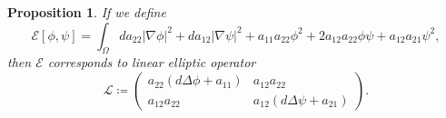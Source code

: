\documentclass[11pt]{amsart}
\numberwithin{equation}{section}
\theoremstyle{plain}
\newtheorem{proposition}[theorem]{Proposition}
\theoremstyle{definition}
\begin{document}
\begin{proposition}
If we define
\begin{equation} \label{energy functional}
	\mathcal{E}[\phi,\psi]=\int_{\Omega} da_{22}\lvert \nabla \phi \rvert^2+da_{12} \lvert \nabla \psi \rvert^2 +a_{11}a_{22} \phi^2+2a_{12}a_{22}\phi\psi+a_{12}a_{21} \psi^2,
\end{equation}
then $\mathcal{E}$ corresponds to linear elliptic operator
\begin{equation*}
	\mathcal{L} \coloneqq \begin{pmatrix}
	a_{22}(d\Delta \phi +a_{11}) & a_{12}a_{22} \\
		a_{12}a_{22} & a_{12}(d\Delta\psi+ a_{21})
\end{pmatrix}.
\end{equation*}
\end{proposition}
\end{document}
